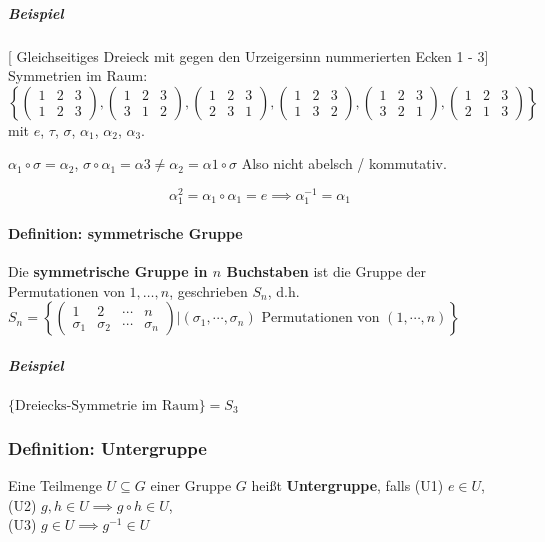 \documentclass[14pt,a4paper]{article}
\begin{document}
  \subparagraph{Beispiel}
  [ Gleichseitiges Dreieck mit gegen den Urzeigersinn nummerierten Ecken 1 - 3]\\
  Symmetrien im Raum: $$ \left\{
    \begin{pmatrix} 1 & 2 & 3 \\ 1 & 2 & 3 \end{pmatrix},
    \begin{pmatrix} 1 & 2 & 3 \\ 3 & 1 & 2 \end{pmatrix},
    \begin{pmatrix} 1 & 2 & 3 \\ 2 & 3 & 1 \end{pmatrix},
    \begin{pmatrix} 1 & 2 & 3 \\ 1 & 3 & 2 \end{pmatrix},
    \begin{pmatrix} 1 & 2 & 3 \\ 3 & 2 & 1 \end{pmatrix},
    \begin{pmatrix} 1 & 2 & 3 \\ 2 & 1 & 3 \end{pmatrix}
  \right\}$$
  mit $e$, $\tau$, $\sigma$, $\alpha_1$, $\alpha_2$, $\alpha_3$.

  $\alpha_1 \circ \sigma = \alpha_2$, $\sigma \circ \alpha_1 = \alpha 3 \neq
  \alpha_2 = \alpha1 \circ \sigma$
  Also nicht abelsch / kommutativ.

  $$ \alpha_1^2 = \alpha_1 \circ \alpha_1 = e \implies \alpha_1^{-1} =
  \alpha_1$$

  \paragraph{Definition: symmetrische Gruppe}
  Die \textbf{symmetrische Gruppe in $n$ Buchstaben} ist die Gruppe der
  Permutationen von ${1, \dots, n}$, geschrieben $S_n$, d.h. $S_n =
  \left\{ \begin{pmatrix} 1 & 2 & \cdots & n \\ \sigma_1 & \sigma_2 & \cdots &
      \sigma_n \end{pmatrix} | (\sigma_1, \dotsb, \sigma_n) \text{ Permutationen
      von } (1, \dotsb, n) \right\}$

  \subparagraph{Beispiel}
  $\{\text{Dreiecks-Symmetrie im Raum}\} = S_3$

  \subsubsection{Definition: Untergruppe}
  Eine Teilmenge $U \subseteq G$ einer Gruppe $G$ heißt \textbf{Untergruppe},
  falls (U1) $e \in U$, (U2) $g,h \in U \implies g \circ h \in U$, \\ (U3) $g \in U
  \implies g^{-1} \in U$
\end{document}
